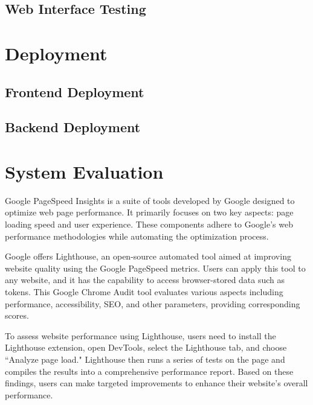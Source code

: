 \subsection{Web Interface Testing}

\section{Deployment}
\subsection{Frontend Deployment}
\subsection{Backend Deployment}

\section{System Evaluation}
Google PageSpeed Insights \cite{google_page_speed} is a suite of tools developed by Google designed to optimize web page performance. It primarily focuses on two key aspects: page loading speed and user experience. These components adhere to Google's web performance methodologies while automating the optimization process.

Google offers Lighthouse, an open-source automated tool aimed at improving website quality using the Google PageSpeed metrics. Users can apply this tool to any website, and it has the capability to access browser-stored data such as tokens. This Google Chrome Audit tool evaluates various aspects including performance, accessibility, SEO, and other parameters, providing corresponding scores.

To assess website performance using Lighthouse, users need to install the Lighthouse extension, open DevTools, select the Lighthouse tab, and choose ``Analyze page load." Lighthouse then runs a series of tests on the page and compiles the results into a comprehensive performance report. Based on these findings, users can make targeted improvements to enhance their website's overall performance.
